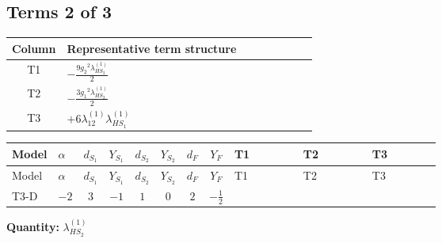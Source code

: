 \documentclass[8pt]{article}
\begin{document}
\begin{landscape}
\subsection*{Terms 2 of 3}
\begin{center}
\begin{tabular}{@{}c >{\raggedright\arraybackslash}p{0.82\linewidth}@{}}
\toprule
Column & Representative term structure \\
\midrule
T1 & \(\displaystyle -\frac{9 {g_2}^2 {\lambda_{HS_2}^{(1)}}}{2}\) \\
\midrule
T2 & \(\displaystyle -\frac{3 {g_1}^2 {\lambda_{HS_2}^{(1)}}}{2}\) \\
\midrule
T3 & \(\displaystyle +6 {\lambda_{12}^{(1)}} {\lambda_{HS_1}^{(1)}}\) \\
\midrule
\bottomrule
\end{tabular}
\end{center}
\smallskip
\tiny
\begin{longtable}{@{}llcccccc >{\raggedright\arraybackslash}p{0.21\linewidth} >{\raggedright\arraybackslash}p{0.21\linewidth} >{\raggedright\arraybackslash}p{0.21\linewidth}@{}}
\toprule
Model & $\alpha$ & $d_{S_1}$ & $Y_{S_1}$ & $d_{S_2}$ & $Y_{S_2}$ & $d_F$ & $Y_F$ & T1 & T2 & T3 \\
\midrule
\endfirsthead
\toprule
Model & $\alpha$ & $d_{S_1}$ & $Y_{S_1}$ & $d_{S_2}$ & $Y_{S_2}$ & $d_F$ & $Y_F$ & T1 & T2 & T3 \\
\midrule
\endhead
T3-D & $-2$ & $3$ & $-1$ & $1$ & $0$ & $2$ & $-\frac{1}{2}$ & \scriptsize\adjustbox{max width=\linewidth}{$\begin{gathered} -\frac{9 {g_2}^2 {\lambda_{HS_2}^{(1)}}}{2}\end{gathered}$} & \scriptsize\adjustbox{max width=\linewidth}{$\begin{gathered} -\frac{3 {g_1}^2 {\lambda_{HS_2}^{(1)}}}{2}\end{gathered}$} & \scriptsize\adjustbox{max width=\linewidth}{$\begin{gathered} +6 {\lambda_{12}^{(1)}} {\lambda_{HS_1}^{(1)}}\end{gathered}$} \\
\midrule
\bottomrule
\end{longtable}
\clearpage
\noindent\textbf{Quantity: }$\lambda_{HS_2}^{(1)}$\par\smallskip

\end{landscape}
\end{document}
